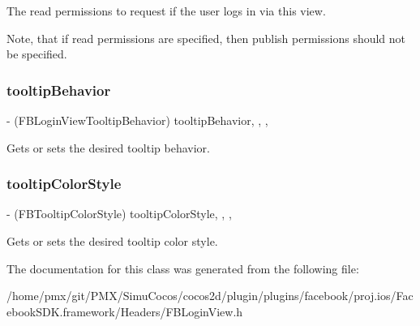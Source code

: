 The read permissions to request if the user logs in via this view.

Note, that if read permissions are specified, then publish permissions should not be specified. \mbox{\label{interfaceFBLoginView_a4a53052d99f7d52e483a20ef3c39b6c8}} 
\subsubsection{\texorpdfstring{tooltip\+Behavior}{tooltipBehavior}}
{\footnotesize\ttfamily -\/ (F\+B\+Login\+View\+Tooltip\+Behavior) tooltip\+Behavior\hspace{0.3cm}{\ttfamily [read]}, {\ttfamily [write]}, {\ttfamily [nonatomic]}, {\ttfamily [assign]}}

Gets or sets the desired tooltip behavior. \mbox{\label{interfaceFBLoginView_a4fa7e4f312b167278b88b4989b159af2}} 
\subsubsection{\texorpdfstring{tooltip\+Color\+Style}{tooltipColorStyle}}
{\footnotesize\ttfamily -\/ (F\+B\+Tooltip\+Color\+Style) tooltip\+Color\+Style\hspace{0.3cm}{\ttfamily [read]}, {\ttfamily [write]}, {\ttfamily [nonatomic]}, {\ttfamily [assign]}}

Gets or sets the desired tooltip color style. 

The documentation for this class was generated from the following file\+:\begin{DoxyCompactItemize}
\item 
/home/pmx/git/\+P\+M\+X/\+Simu\+Cocos/cocos2d/plugin/plugins/facebook/proj.\+ios/\+Facebook\+S\+D\+K.\+framework/\+Headers/F\+B\+Login\+View.\+h\end{DoxyCompactItemize}
